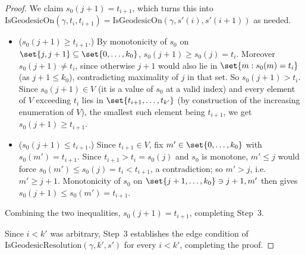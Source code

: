 \begin{proof}
  We claim $s_0(j+1) = t_{i+1}$, which turns this into
  $\mathrm{IsGeodesicOn}(\gamma,t_i,t_{i+1}) = \mathrm{IsGeodesicOn}(\gamma,s'(i),s'(i+1))$ as needed.
  \begin{itemize}
    \item ($s_0(j+1) \ge t_{i+1}$.) By monotonicity of $s_0$ on $\set{j,j+1} \subseteq
      \set{0,\dots,k_0}$, $s_0(j+1) \ge s_0(j) = t_i$. Moreover $s_0(j+1) \ne t_i$, since otherwise
      $j+1$ would also lie in $\set{m : s_0(m)=t_i}$ (as $j+1 \le k_0$), contradicting maximality of
      $j$ in that set. So $s_0(j+1) > t_i$. Since $s_0(j+1) \in V$ (it is a value of $s_0$ at a
      valid index) and every element of $V$ exceeding $t_i$ lies in $\set{t_{i+1},\dots,t_{k'}}$ (by
      construction of the increasing enumeration of $V$), the smallest such element being
      $t_{i+1}$, we get $s_0(j+1) \ge t_{i+1}$.
    \item ($s_0(j+1) \le t_{i+1}$.) Since $t_{i+1} \in V$, fix $m' \in \set{0,\dots,k_0}$ with
      $s_0(m') = t_{i+1}$. Since $t_{i+1} > t_i = s_0(j)$ and $s_0$ is monotone, $m' \le j$ would
      force $s_0(m') \le s_0(j) = t_i < t_{i+1}$, a contradiction; so $m' > j$, i.e.\ $m' \ge j+1$.
      Monotonicity of $s_0$ on $\set{j+1,\dots,k_0} \ni j+1,m'$ then gives $s_0(j+1) \le s_0(m') =
      t_{i+1}$.
  \end{itemize}
  Combining the two inequalities, $s_0(j+1) = t_{i+1}$, completing Step~3.

  Since $i<k'$ was arbitrary, Step~3 establishes the edge condition of
  $\mathrm{IsGeodesicResolution}(\gamma,k',s')$ for every $i<k'$, completing the proof.
\end{proof}
